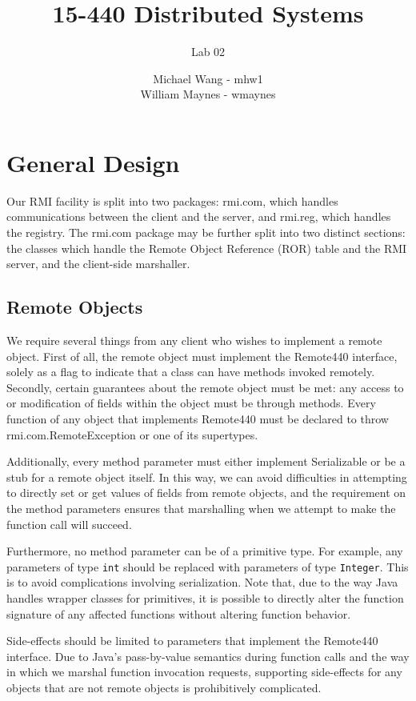\documentclass{scrartcl}
\title{15-440 Distributed Systems}
\subtitle{Lab 02}
\author{Michael Wang - mhw1\\William Maynes - wmaynes}
\begin{document}
\maketitle


\section{General Design}

Our RMI facility is split into two packages: rmi.com, which handles communications between the client and the server, and rmi.reg, which handles the registry.  The rmi.com package may be further split into two distinct sections: the classes which 
handle the Remote Object Reference (ROR) table and the RMI server, and the client-side marshaller.

\subsection{Remote Objects}

We require several things from any client who wishes to implement a remote object.  First of all, the remote object must implement the Remote440 interface, solely as a flag to indicate that a class can have methods invoked remotely.  Secondly, certain guarantees about the remote object must be met: any access to or modification of fields within the object must be through methods.  Every function of any object that implements Remote440 must be declared to throw rmi.com.RemoteException or one of its supertypes.

Additionally, every method parameter must either implement Serializable or be a stub for a remote object itself.  In this way, we can avoid difficulties in attempting to directly set or get values of fields from remote objects, and the requirement on the method parameters ensures that marshalling when we attempt to make the function call will succeed.

Furthermore, no method parameter can be of a primitive type.  For example, any parameters of type \verb$int$ should be replaced with parameters of type \verb$Integer$.  This is to avoid complications involving serialization.  Note that, due to the way Java handles wrapper classes for primitives, it is possible to directly alter the function signature of any affected functions without altering function behavior.

Side-effects should be limited to parameters that implement the Remote440 interface.  Due to Java's pass-by-value semantics during function calls and the way in which we marshal function invocation requests, supporting side-effects for any objects that are not remote objects is prohibitively complicated.
\end{document}

